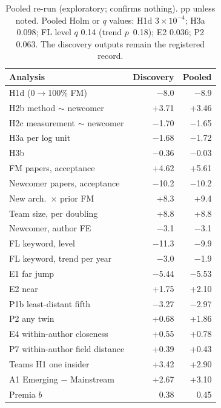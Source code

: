 \begin{table}[t]
\centering\footnotesize
\setlength{\tabcolsep}{3pt}
\begin{tabular}{@{}lrr@{}}
\toprule
Analysis & Discovery & Pooled \\
\midrule
H1d (0$\to$100\% FM) & $-$8.0 & $-$8.9 \\
H2b method $\sim$ newcomer & +3.71 & +3.46 \\
H2c measurement $\sim$ newcomer & $-$1.70 & $-$1.65 \\
H3a per log unit & $-$1.68 & $-$1.72 \\
H3b & $-$0.36 & $-$0.03 \\
FM papers, acceptance & +4.62 & +5.61 \\
Newcomer papers, acceptance & $-$10.2 & $-$10.2 \\
New arch.\ $\times$ prior FM & +8.3 & +9.4 \\
Team size, per doubling & +8.8 & +8.8 \\
Newcomer, author FE & $-$3.1 & $-$3.1 \\
FL keyword, level & $-$11.3 & $-$9.9 \\
FL keyword, trend per year & $-$3.0 & $-$1.9 \\
E1 far jump & $-$5.44 & $-$5.53 \\
E2 near & +1.75 & +2.10 \\
P1b least-distant fifth & $-$3.27 & $-$2.97 \\
P2 any twin & +0.68 & +1.86 \\
E4 within-author closeness & +0.55 & +0.78 \\
P7 within-author field distance & +0.39 & +0.43 \\
Teams H1 one insider & +3.42 & +2.90 \\
A1 Emerging $-$ Mainstream & +2.67 & +3.10 \\
Premia $b$ & 0.38 & 0.45 \\
\bottomrule
\end{tabular}
\caption{Pooled re-run (exploratory; confirms nothing). pp unless noted. Pooled Holm or $q$ values: H1d
$3\times10^{-4}$; H3a 0.098; FL level $q$ 0.14 (trend $p$~0.18); E2 0.036; P2 0.063. The discovery outputs remain the
registered record.}
\label{tab:app-pooled}
\end{table}

